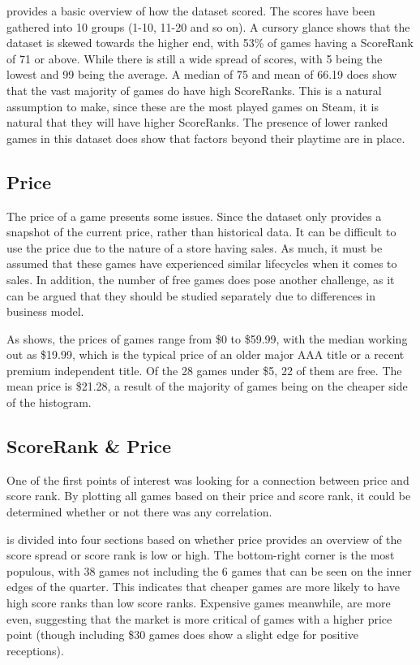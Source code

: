 \documentclass[dataset.tex]{subfiles}
\begin{document}
 provides a basic overview of how the dataset scored.
The scores have been gathered into 10 groups (1-10, 11-20 and so on). A cursory
glance shows that the dataset is skewed towards the higher end, with 53\% of
games having a ScoreRank of 71 or above. While there is still a wide spread of
scores, with 5 being the lowest and 99 being the average. A median of 75 and
mean of 66.19 does show that the vast majority of games do have high ScoreRanks.
This is a natural assumption to make, since these are the most played games on
Steam, it is natural that they will have higher ScoreRanks. The presence of
lower ranked games in this dataset does show that factors beyond their playtime
are in place.

\subsection{Price} %
\label{sub:price}
The price of a game presents some issues. Since the dataset only provides a
snapshot of the current price, rather than historical data. It can be difficult
to use the price due to the nature of a store having sales. As much, it must be
assumed that these games have experienced similar lifecycles when it comes to
sales. In addition, the number of free games does pose another challenge, as it
can be argued that they should be studied separately due to differences in
business model.

As  shows, the prices of games range from \$0 to \$59.99,
with the median working out as \$19.99, which is the typical price of an older
major AAA title or a recent premium independent title. Of the 28 games under
\$5, 22 of them are free. The mean price is \$21.28, a result of the majority of
games being on the cheaper side of the histogram.

\subsection{ScoreRank \& Price} %
\label{sub:scorerank_price}
One of the first points of interest was looking for a connection between price
and score rank. By plotting all games based on their price and score rank, it
could be determined whether or not there was any correlation.

 is divided into four sections based on whether price
provides an overview of the score spread or score rank is low or high. The
bottom-right corner is the most populous, with 38 games not including the 6
games that can be seen on the inner edges of the quarter. This indicates that
cheaper games are more likely to have high score ranks than low score ranks.
Expensive games meanwhile, are more even, suggesting that the market is more
critical of games with a higher price point (though including \$30 games does
show a slight edge for positive receptions).
\end{document}
